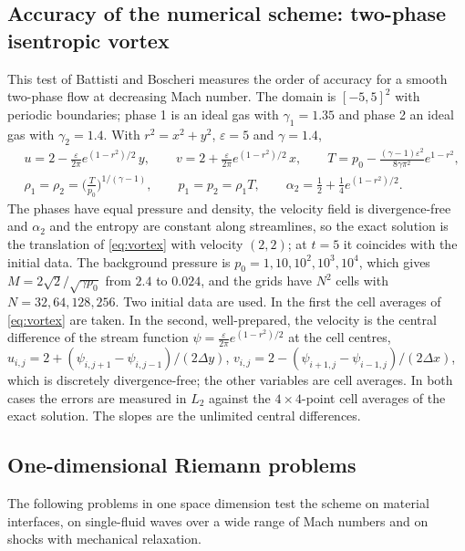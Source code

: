 \documentclass[a4paper,fleqn]{cas-sc}
\begin{document}
\subsection{Accuracy of the numerical scheme: two-phase isentropic vortex}
\label{sec:res_vortex}
This test of Battisti and Boscheri \cite[Sec.~4.1]{BattistiBoscheri2025} measures the order of accuracy for a smooth two-phase flow at decreasing
Mach number. The domain is $[-5,5]^2$ with periodic boundaries; phase 1 is an ideal gas with $\gamma_1=1.35$ and
phase 2 an ideal gas with $\gamma_2=1.4$. With $r^2=x^2+y^2$, $\varepsilon=5$ and $\gamma=1.4$,
\begin{equation}
\begin{aligned}
&u=2-\frac{\varepsilon}{2\pi}e^{(1-r^2)/2}\,y,\qquad v=2+\frac{\varepsilon}{2\pi}e^{(1-r^2)/2}\,x,\qquad
T=p_0-\frac{(\gamma-1)\varepsilon^2}{8\gamma\pi^2}e^{1-r^2},\\
&\rho_1=\rho_2=\Big(\frac{T}{p_0}\Big)^{1/(\gamma-1)},\qquad p_1=p_2=\rho_1T,\qquad \alpha_2=\frac12+\frac14e^{(1-r^2)/2}.
\end{aligned}
\label{eq:vortex}
\end{equation}
The phases have equal pressure and density, the velocity field is divergence-free and $\alpha_2$ and the entropy are
constant along streamlines, so the exact solution is the translation of \eqref{eq:vortex} with velocity $(2,2)$; at
$t=5$ it coincides with the initial data. The background pressure is $p_0=1,10,10^2,10^3,10^4$, which gives
$M=2\sqrt2/\sqrt{\gamma p_0}$ from $2.4$ to $0.024$, and the grids have $N^2$ cells with $N=32,64,128,256$. Two initial
data are used. In the first the cell averages of \eqref{eq:vortex} are taken. In the second, well-prepared, the
velocity is the central difference of the stream function $\psi=\frac{\varepsilon}{2\pi}e^{(1-r^2)/2}$ at the cell
centres, $u_{i,j}=2+(\psi_{i,j+1}-\psi_{i,j-1})/(2\Delta y)$, $v_{i,j}=2-(\psi_{i+1,j}-\psi_{i-1,j})/(2\Delta x)$, which is discretely
divergence-free; the other variables are cell
averages. In both cases the errors are measured in $L_2$ against the $4\times4$-point cell averages of the exact solution. The slopes are the unlimited central differences.

\subsection{One-dimensional Riemann problems}
\label{sec:res_1d}
The following problems in one space dimension test the scheme on material interfaces, on single-fluid waves over a wide
range of Mach numbers and on shocks with mechanical relaxation.
\end{document}
